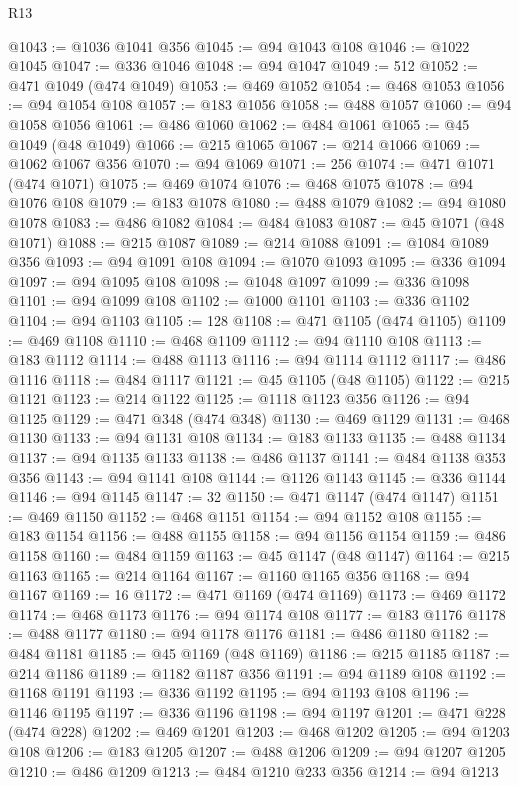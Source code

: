 \begin{lexlean}{R13}
\begin{coremodule}
@1043 := @1036 @1041 @356
@1045 := @94 @1043 @108
@1046 := @1022 @1045
@1047 := @336 @1046
@1048 := @94 @1047
@1049 := 512
@1052 := @471 @1049 (@474 @1049)
@1053 := @469 @1052
@1054 := @468 @1053
@1056 := @94 @1054 @108
@1057 := @183 @1056
@1058 := @488 @1057
@1060 := @94 @1058 @1056
@1061 := @486 @1060
@1062 := @484 @1061
@1065 := @45 @1049 (@48 @1049)
@1066 := @215 @1065
@1067 := @214 @1066
@1069 := @1062 @1067 @356
@1070 := @94 @1069
@1071 := 256
@1074 := @471 @1071 (@474 @1071)
@1075 := @469 @1074
@1076 := @468 @1075
@1078 := @94 @1076 @108
@1079 := @183 @1078
@1080 := @488 @1079
@1082 := @94 @1080 @1078
@1083 := @486 @1082
@1084 := @484 @1083
@1087 := @45 @1071 (@48 @1071)
@1088 := @215 @1087
@1089 := @214 @1088
@1091 := @1084 @1089 @356
@1093 := @94 @1091 @108
@1094 := @1070 @1093
@1095 := @336 @1094
@1097 := @94 @1095 @108
@1098 := @1048 @1097
@1099 := @336 @1098
@1101 := @94 @1099 @108
@1102 := @1000 @1101
@1103 := @336 @1102
@1104 := @94 @1103
@1105 := 128
@1108 := @471 @1105 (@474 @1105)
@1109 := @469 @1108
@1110 := @468 @1109
@1112 := @94 @1110 @108
@1113 := @183 @1112
@1114 := @488 @1113
@1116 := @94 @1114 @1112
@1117 := @486 @1116
@1118 := @484 @1117
@1121 := @45 @1105 (@48 @1105)
@1122 := @215 @1121
@1123 := @214 @1122
@1125 := @1118 @1123 @356
@1126 := @94 @1125
@1129 := @471 @348 (@474 @348)
@1130 := @469 @1129
@1131 := @468 @1130
@1133 := @94 @1131 @108
@1134 := @183 @1133
@1135 := @488 @1134
@1137 := @94 @1135 @1133
@1138 := @486 @1137
@1141 := @484 @1138 @353 @356
@1143 := @94 @1141 @108
@1144 := @1126 @1143
@1145 := @336 @1144
@1146 := @94 @1145
@1147 := 32
@1150 := @471 @1147 (@474 @1147)
@1151 := @469 @1150
@1152 := @468 @1151
@1154 := @94 @1152 @108
@1155 := @183 @1154
@1156 := @488 @1155
@1158 := @94 @1156 @1154
@1159 := @486 @1158
@1160 := @484 @1159
@1163 := @45 @1147 (@48 @1147)
@1164 := @215 @1163
@1165 := @214 @1164
@1167 := @1160 @1165 @356
@1168 := @94 @1167
@1169 := 16
@1172 := @471 @1169 (@474 @1169)
@1173 := @469 @1172
@1174 := @468 @1173
@1176 := @94 @1174 @108
@1177 := @183 @1176
@1178 := @488 @1177
@1180 := @94 @1178 @1176
@1181 := @486 @1180
@1182 := @484 @1181
@1185 := @45 @1169 (@48 @1169)
@1186 := @215 @1185
@1187 := @214 @1186
@1189 := @1182 @1187 @356
@1191 := @94 @1189 @108
@1192 := @1168 @1191
@1193 := @336 @1192
@1195 := @94 @1193 @108
@1196 := @1146 @1195
@1197 := @336 @1196
@1198 := @94 @1197
@1201 := @471 @228 (@474 @228)
@1202 := @469 @1201
@1203 := @468 @1202
@1205 := @94 @1203 @108
@1206 := @183 @1205
@1207 := @488 @1206
@1209 := @94 @1207 @1205
@1210 := @486 @1209
@1213 := @484 @1210 @233 @356
@1214 := @94 @1213

\end{coremodule}
\end{lexlean}
